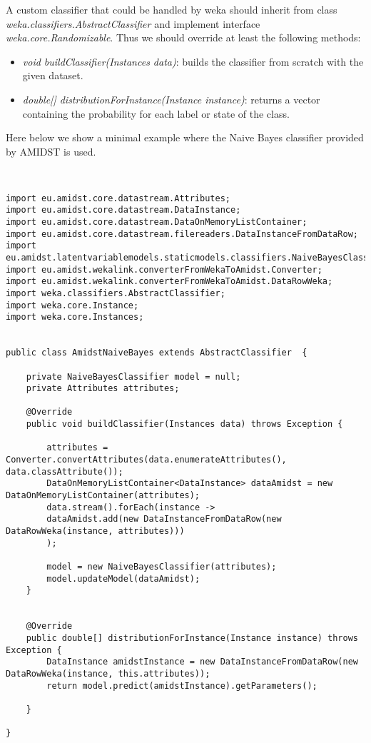 \documentclass[10pt,a4paper]{article}
\begin{document}
A custom classifier that could be handled by weka should inherit from class \textit{weka.classifiers.AbstractClassifier} and implement interface \textit{weka.core.Randomizable}. Thus we should override at least the following methods:

\begin{itemize}
	\item \textit{void buildClassifier(Instances data)}: builds the classifier from scratch with the given dataset.
	\item \textit{double[] distributionForInstance(Instance instance)}: returns a vector containing the probability for each label or state of the class.
\end{itemize}

Here below we show a minimal example where the Naive Bayes classifier provided by AMIDST is used.

\begin{verbatim}


import eu.amidst.core.datastream.Attributes;
import eu.amidst.core.datastream.DataInstance;
import eu.amidst.core.datastream.DataOnMemoryListContainer;
import eu.amidst.core.datastream.filereaders.DataInstanceFromDataRow;
import eu.amidst.latentvariablemodels.staticmodels.classifiers.NaiveBayesClassifier;
import eu.amidst.wekalink.converterFromWekaToAmidst.Converter;
import eu.amidst.wekalink.converterFromWekaToAmidst.DataRowWeka;
import weka.classifiers.AbstractClassifier;
import weka.core.Instance;
import weka.core.Instances;


public class AmidstNaiveBayes extends AbstractClassifier  {
	
	private NaiveBayesClassifier model = null;
	private Attributes attributes;
	
	@Override
	public void buildClassifier(Instances data) throws Exception {
		
		attributes = Converter.convertAttributes(data.enumerateAttributes(), data.classAttribute());
		DataOnMemoryListContainer<DataInstance> dataAmidst = new DataOnMemoryListContainer(attributes);
		data.stream().forEach(instance ->
		dataAmidst.add(new DataInstanceFromDataRow(new DataRowWeka(instance, attributes)))
		);
		
		model = new NaiveBayesClassifier(attributes);
		model.updateModel(dataAmidst);
	}
	
	
	@Override
	public double[] distributionForInstance(Instance instance) throws Exception {
		DataInstance amidstInstance = new DataInstanceFromDataRow(new DataRowWeka(instance, this.attributes));
		return model.predict(amidstInstance).getParameters();
		
	}

}


\end{verbatim}
\end{document}
